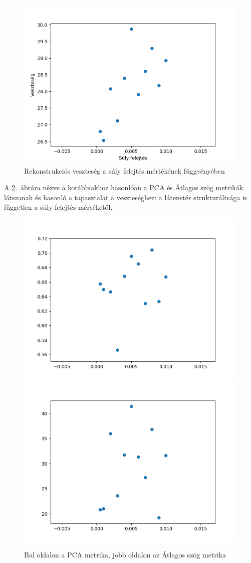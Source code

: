 \begin{figure}[h!]
\begin{center}
  
  \includegraphics[width=0.75\linewidth]{metrics/vae_wd-loss.png}
  \caption{Rekonstrukciós veszteség a súly felejtés mértékének függvényében}\label{wd-loss}
\end{center}
\end{figure}

A \ref{wd-metrics}.~ábrára nézve a korábbiakhoz hasonlóan a PCA és Átlagos szög metrikák látszanak és hasonló a tapasztalat a veszteséghez: a látenstér strukturáltsága is független a súly felejtés mértékétől.

\begin{figure}[h!]
  
  \includegraphics[width=0.5\linewidth]{vae_wd-pca.png}
  \includegraphics[width=0.5\linewidth]{vae_wd-as.png}
  \caption{Bal oldalon a PCA metrika, jobb oldalon az Átlagos szög metrika}\label{wd-metrics}
\end{figure}

